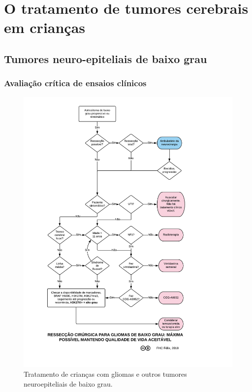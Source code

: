 \documentclass[11pt,a4paper,oldfontcommands]{memoir}
\begin{document}
\chapter{O tratamento de tumores cerebrais em crianças}

\section{Tumores neuro-epiteliais de baixo grau}

\subsection{Avaliação crítica de ensaios clínicos}
\begin{figure}[!htb]
\includegraphics[scale=0.87,trim = 18mm 0mm 15mm 5mm,clip]{fig/fig3.pdf}
\caption{Tratamento de crianças com gliomas e outros tumores neuroepiteliais de baixo grau.}
\end{figure}
\end{document}
